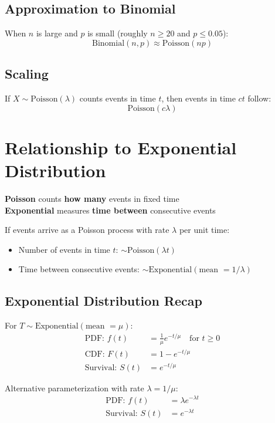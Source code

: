 \documentclass[11pt]{article}
\begin{document}
\subsection{Approximation to Binomial}
When $n$ is large and $p$ is small (roughly $n \geq 20$ and $p \leq 0.05$):
\[
\text{Binomial}(n, p) \approx \text{Poisson}(np)
\]

\subsection{Scaling}
If $X \sim \text{Poisson}(\lambda)$ counts events in time $t$, then events in time $ct$ follow:
\[
\text{Poisson}(c\lambda)
\]

\section{Relationship to Exponential Distribution}

\begin{tcolorbox}[colback=green!5!white,colframe=green!75!black,title=Crucial Connection]
\textbf{Poisson} counts \textbf{how many} events in fixed time \\
\textbf{Exponential} measures \textbf{time between} consecutive events
\end{tcolorbox}

\vspace{0.3cm}

If events arrive as a Poisson process with rate $\lambda$ per unit time:
\begin{itemize}
    \item Number of events in time $t$: $\sim \text{Poisson}(\lambda t)$
    \item Time between consecutive events: $\sim \text{Exponential}(\text{mean } = 1/\lambda)$
\end{itemize}

\subsection{Exponential Distribution Recap}
For $T \sim \text{Exponential}(\text{mean } = \mu)$:
\begin{align*}
\text{PDF: } f(t) &= \frac{1}{\mu} e^{-t/\mu} \quad \text{for } t \geq 0 \\
\text{CDF: } F(t) &= 1 - e^{-t/\mu} \\
\text{Survival: } S(t) &= e^{-t/\mu}
\end{align*}

Alternative parameterization with rate $\lambda = 1/\mu$:
\begin{align*}
\text{PDF: } f(t) &= \lambda e^{-\lambda t} \\
\text{Survival: } S(t) &= e^{-\lambda t}
\end{align*}
\end{document}
